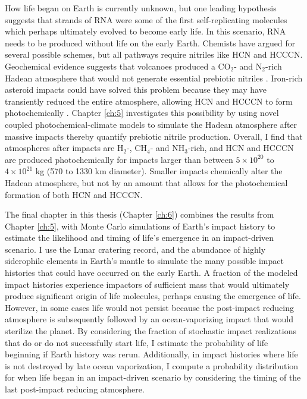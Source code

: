 How life began on Earth is currently unknown, but one leading hypothesis suggests that strands of RNA were some of the first self-replicating molecules which perhaps ultimately evolved to become early life. In this scenario, RNA needs to be produced without life on the early Earth. Chemists have argued for several possible schemes, but all pathways require nitriles like HCN and HCCCN. Geochemical evidence suggests that volcanoes produced a CO$_2$- and N$_2$-rich Hadean atmosphere that would not generate essential prebiotic nitriles \citep{Holland_1984}. Iron-rich asteroid impacts could have solved this problem because they may have transiently reduced the entire atmosphere, allowing HCN and HCCCN to form photochemically \citep{Zahnle_2020}. Chapter \ref{ch:5} investigates this possibility by using novel coupled photochemical-climate models to simulate the Hadean atmosphere after massive impacts thereby quantify prebiotic nitrile production. Overall, I find that atmospheres after impacts are H$_2$-, CH$_4$- and NH$_3$-rich, and HCN and HCCCN are produced photochemically for impacts larger than between $5 \times 10^{20}$ to $4 \times 10^{21}$ kg (570 to 1330 km diameter). Smaller impacts chemically alter the Hadean atmosphere, but not by an amount that allows for the photochemical formation of both HCN and HCCCN. 

The final chapter in this thesis (Chapter \ref{ch:6}) combines the results from Chapter \ref{ch:5}, with Monte Carlo simulations of Earth's impact history to estimate the likelihood and timing of life's emergence in an impact-driven scenario. I use the Lunar cratering record, and the abundance of highly siderophile elements in Earth's mantle to simulate the many possible impact histories that could have occurred on the early Earth. A fraction of the modeled impact histories experience impactors of sufficient mass that would ultimately produce significant origin of life molecules, perhaps causing the emergence of life. However, in some cases life would not persist because the post-impact reducing atmosphere is subsequently followed by an ocean-vaporizing impact that would sterilize the planet. By considering the fraction of stochastic impact realizations that do or do not successfully start life, I estimate the probability of life beginning if Earth history was rerun. Additionally, in impact histories where life is not destroyed by late ocean vaporization, I compute a probability distribution for when life began in an impact-driven scenario by considering the timing of the last post-impact reducing atmosphere.








